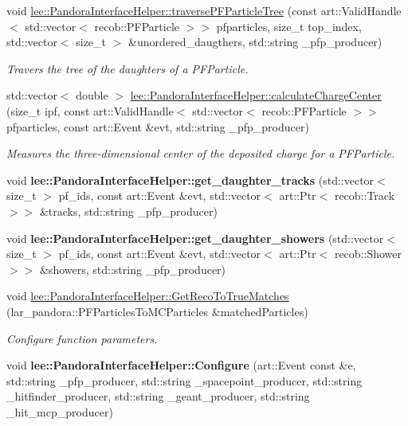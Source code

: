 \begin{DoxyCompactItemize}
\item 
void \hyperlink{group__lee_ga5f3e6eecea4f75ea9eea31e520b4f0bc}{lee\-::\-Pandora\-Interface\-Helper\-::traverse\-P\-F\-Particle\-Tree} (const art\-::\-Valid\-Handle$<$ std\-::vector$<$ recob\-::\-P\-F\-Particle $>$$>$ pfparticles, size\-\_\-t top\-\_\-index, std\-::vector$<$ size\-\_\-t $>$ \&unordered\-\_\-daugthers, std\-::string \-\_\-pfp\-\_\-producer)
\begin{DoxyCompactList}\small\item\em Travers the tree of the daughters of a P\-F\-Particle. \end{DoxyCompactList}\item 
std\-::vector$<$ double $>$ \hyperlink{group__lee_ga367b3ad86924343d3ab54fa8c84091af}{lee\-::\-Pandora\-Interface\-Helper\-::calculate\-Charge\-Center} (size\-\_\-t ipf, const art\-::\-Valid\-Handle$<$ std\-::vector$<$ recob\-::\-P\-F\-Particle $>$$>$ pfparticles, const art\-::\-Event \&evt, std\-::string \-\_\-pfp\-\_\-producer)
\begin{DoxyCompactList}\small\item\em Measures the three-\/dimensional center of the deposited charge for a P\-F\-Particle. \end{DoxyCompactList}\item 
\hypertarget{group__lee_ga30273cdf4f136187b522c237e61b864e}{void {\bfseries lee\-::\-Pandora\-Interface\-Helper\-::get\-\_\-daughter\-\_\-tracks} (std\-::vector$<$ size\-\_\-t $>$ pf\-\_\-ids, const art\-::\-Event \&evt, std\-::vector$<$ art\-::\-Ptr$<$ recob\-::\-Track $>$$>$ \&tracks, std\-::string \-\_\-pfp\-\_\-producer)}\label{group__lee_ga30273cdf4f136187b522c237e61b864e}

\item 
\hypertarget{group__lee_ga2219037e4e0677d9aeb55e9615b19131}{void {\bfseries lee\-::\-Pandora\-Interface\-Helper\-::get\-\_\-daughter\-\_\-showers} (std\-::vector$<$ size\-\_\-t $>$ pf\-\_\-ids, const art\-::\-Event \&evt, std\-::vector$<$ art\-::\-Ptr$<$ recob\-::\-Shower $>$$>$ \&showers, std\-::string \-\_\-pfp\-\_\-producer)}\label{group__lee_ga2219037e4e0677d9aeb55e9615b19131}

\item 
void \hyperlink{group__lee_gaedec8759b64e578d4d27e4dd57bc2111}{lee\-::\-Pandora\-Interface\-Helper\-::\-Get\-Reco\-To\-True\-Matches} (lar\-\_\-pandora\-::\-P\-F\-Particles\-To\-M\-C\-Particles \&matched\-Particles)
\begin{DoxyCompactList}\small\item\em Configure function parameters. \end{DoxyCompactList}\item 
\hypertarget{group__lee_gacea920f6926b69221a6a04d17e38cbf9}{void {\bfseries lee\-::\-Pandora\-Interface\-Helper\-::\-Configure} (art\-::\-Event const \&e, std\-::string \-\_\-pfp\-\_\-producer, std\-::string \-\_\-spacepoint\-\_\-producer, std\-::string \-\_\-hitfinder\-\_\-producer, std\-::string \-\_\-geant\-\_\-producer, std\-::string \-\_\-hit\-\_\-mcp\-\_\-producer)}\label{group__lee_gacea920f6926b69221a6a04d17e38cbf9}


\end{DoxyCompactItemize}
